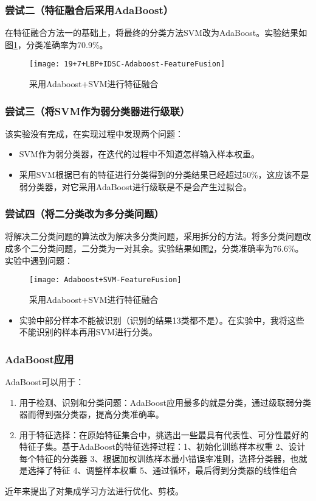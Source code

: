 \subsubsection{尝试二（特征融合后采用AdaBoost）}
在特征融合方法一的基础上，将最终的分类方法SVM改为AdaBoost。实验结果如图\ref{fig:19+7+LBP+IDSC-Adaboost-FeatureFusion}，分类准确率为70.9\%。
\begin{figure}[!ht]
\centering
\texttt{[image: 19+7+LBP+IDSC-Adaboost-FeatureFusion]}
\caption{采用Adaboost+SVM进行特征融合}
\label{fig:19+7+LBP+IDSC-Adaboost-FeatureFusion}
\end{figure}


\subsubsection{尝试三（将SVM作为弱分类器进行级联）}
该实验没有完成，在实现过程中发现两个问题：
\begin{itemize}
\item SVM作为弱分类器，在迭代的过程中不知道怎样输入样本权重。
\item 采用SVM根据已有的特征进行分类得到的分类结果已经超过50\%，这应该不是弱分类器，对它采用AdaBoost进行级联是不是会产生过拟合。
\end{itemize}

\subsubsection{尝试四（将二分类改为多分类问题）}
将解决二分类问题的算法改为解决多分类问题，采用拆分的方法。将多分类问题改成多个二分类问题，二分类为一对其余。实验结果如图\ref{fig:Adaboost+SVM-FeatureFusion}，分类准确率为76.6\%。实验中遇到问题：
\begin{figure}[!ht]
\centering
\texttt{[image: Adaboost+SVM-FeatureFusion]}
\caption{采用Adaboost+SVM进行特征融合}
\label{fig:Adaboost+SVM-FeatureFusion}
\end{figure}
\begin{itemize}
\item 实验中部分样本不能被识别（识别的结果13类都不是）。在实验中，我将这些不能识别的样本再用SVM进行分类。
\end{itemize}

\subsubsection{AdaBoost应用}
AdaBoost可以用于：
\begin{enumerate}
\item 用于检测、识别和分类问题：AdaBoost应用最多的就是分类，通过级联弱分类器而得到强分类器，提高分类准确率。
\item 用于特征选择：在原始特征集合中，挑选出一些最具有代表性、可分性最好的特征子集。基于AdaBoost的特征选择过程：1、初始化训练样本权重 2、设计每个特征的分类器 3、根据加权训练样本最小错误率准则，选择分类器，也就是选择了特征 4、调整样本权重 5、通过循环，最后得到分类器的线性组合
\end{enumerate}
近年来提出了对集成学习方法进行优化、剪枝。


